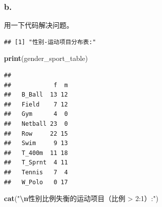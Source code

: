 \documentclass[
]{article}
\newenvironment{Shaded}{\begin{snugshade}}{\end{snugshade}}
\newcommand{\CommentTok}[1]{\textcolor[rgb]{0.56,0.35,0.01}{\textit{#1}}}
\newcommand{\DecValTok}[1]{\textcolor[rgb]{0.00,0.00,0.81}{#1}}
\newcommand{\FunctionTok}[1]{\textcolor[rgb]{0.13,0.29,0.53}{\textbf{#1}}}
\newcommand{\NormalTok}[1]{#1}
\newcommand{\OtherTok}[1]{\textcolor[rgb]{0.56,0.35,0.01}{#1}}
\newcommand{\SpecialCharTok}[1]{\textcolor[rgb]{0.81,0.36,0.00}{\textbf{#1}}}
\newcommand{\StringTok}[1]{\textcolor[rgb]{0.31,0.60,0.02}{#1}}
\begin{document}
\subsubsection{b.}\label{b.-3}

用一下代码解决问题。

\begin{Shaded}
\end{Shaded}

\begin{verbatim}
## [1] "性别-运动项目分布表:"
\end{verbatim}

\begin{Shaded}
\begin{Highlighting}[]
\FunctionTok{print}\NormalTok{(gender\_sport\_table)}
\end{Highlighting}
\end{Shaded}

\begin{verbatim}
##          
##            f  m
##   B_Ball  13 12
##   Field    7 12
##   Gym      4  0
##   Netball 23  0
##   Row     22 15
##   Swim     9 13
##   T_400m  11 18
##   T_Sprnt  4 11
##   Tennis   7  4
##   W_Polo   0 17
\end{verbatim}

\begin{Shaded}
\begin{Highlighting}[]
\FunctionTok{cat}\NormalTok{(}\StringTok{"}\SpecialCharTok{\textbackslash{}n}\StringTok{性别比例失衡的运动项目（比例 \textgreater{} 2:1）:"}\NormalTok{)}
\end{Highlighting}
\end{Shaded}
\end{document}
